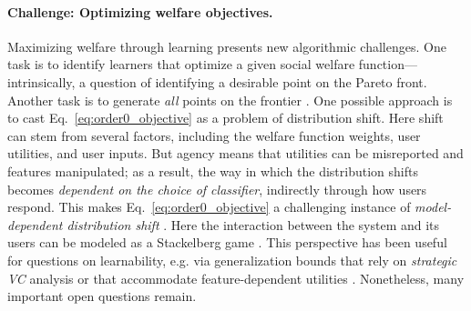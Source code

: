 \paragraph{Challenge: Optimizing welfare objectives.}
Maximizing welfare through learning presents new algorithmic challenges.
One task is to identify learners that optimize a given social welfare function---%
intrinsically, a question of identifying a desirable point on the Pareto front.
Another task is to generate \emph{all} points on the frontier \citep[see, e.g.,][]{navon2021learning}.
One possible approach is to cast
Eq.~\eqref{eq:order0_objective} as a problem of distribution shift.
Here shift can stem from several factors, including
the welfare function weights,
user utilities, and user inputs.
But agency means that utilities can be misreported and features manipulated;
as a result, the way in which the distribution shifts becomes
\emph{dependent on the choice of classifier},
indirectly through how users respond.
This makes Eq.~\eqref{eq:order0_objective} a challenging instance of
\emph{model-dependent distribution shift} \citep{drusvyatskiy2023stochastic}.
Here the interaction between the system and its users 
can be modeled as a Stackelberg game \citep{chen2020learning}.
This perspective has been useful for questions on learnability,
e.g. via generalization bounds
that rely on \emph{strategic VC} analysis
\citep{zhang2021incentive,sundaram2023pac}
or that accommodate feature-dependent utilities \citep{pardeshi2024learning}.
Nonetheless, many important open questions remain.
\squeeze







